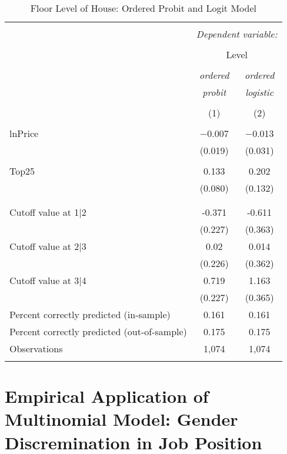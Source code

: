 \documentclass[
  12pt,
]{article}
\begin{document}
\begin{table}[t] \centering 
  \caption{Floor Level of House: Ordered Probit and Logit Model} 
  \label{housing} 
\begin{tabular}{@{\extracolsep{5pt}}lcc} 
\\[-1.8ex]\hline 
\hline \\[-1.8ex] 
 & \multicolumn{2}{c}{\textit{Dependent variable:}} \\ 
\cline{2-3} 
\\[-1.8ex] & \multicolumn{2}{c}{Level} \\ 
\\[-1.8ex] & \textit{ordered} & \textit{ordered} \\ 
 & \textit{probit} & \textit{logistic} \\ 
\\[-1.8ex] & (1) & (2)\\ 
\hline \\[-1.8ex] 
 lnPrice & $-$0.007 & $-$0.013 \\ 
  & (0.019) & (0.031) \\ 
  & & \\ 
 Top25 & 0.133 & 0.202 \\ 
  & (0.080) & (0.132) \\ 
  & & \\ 
\hline \\[-1.8ex] 
Cutoff value at 1|2 & -0.371 & -0.611 \\ 
 & (0.227) & (0.363) \\ 
Cutoff value at 2|3 & 0.02 & 0.014 \\ 
 & (0.226) & (0.362) \\ 
Cutoff value at 3|4 & 0.719 & 1.163 \\ 
 & (0.227) & (0.365) \\ 
Percent correctly predicted (in-sample) & 0.161 & 0.161 \\ 
Percent correctly predicted (out-of-sample) & 0.175 & 0.175 \\ 
Observations & 1,074 & 1,074 \\ 
\hline 
\hline \\[-1.8ex] 
\end{tabular} 
\end{table}

\hypertarget{empirical-application-of-multinomial-model-gender-discremination-in-job-position}{%
\section{Empirical Application of Multinomial Model: Gender
Discremination in Job
Position}\label{empirical-application-of-multinomial-model-gender-discremination-in-job-position}}
\end{document}
